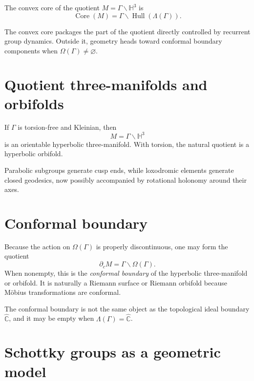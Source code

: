 \begin{definition}\label{def:vii37-convex-core}
The convex core of the quotient \(M=\Gamma\backslash\mathbb H^3\) is
\[
\operatorname{Core}(M)=\Gamma\backslash\operatorname{Hull}(\Lambda(\Gamma)).
\]
\end{definition}

The convex core packages the part of the quotient directly controlled by recurrent group dynamics.  Outside it, geometry heads toward conformal boundary components when \(\Omega(\Gamma)\ne\varnothing\).


\section{Quotient three-manifolds and orbifolds}

\begin{theorem}\label{thm:vii37-quotient}
If \(\Gamma\) is torsion-free and Kleinian, then
\[
M=\Gamma\backslash\mathbb H^3
\]
is an orientable hyperbolic three-manifold.  With torsion, the natural quotient is a hyperbolic orbifold.
\end{theorem}

Parabolic subgroups generate cusp ends, while loxodromic elements generate closed geodesics, now possibly accompanied by rotational holonomy around their axes.


\section{Conformal boundary}

Because the action on \(\Omega(\Gamma)\) is properly discontinuous, one may form the quotient
\[
\partial_c M=\Gamma\backslash\Omega(\Gamma).
\]
When nonempty, this is the \emph{conformal boundary} of the hyperbolic three-manifold or orbifold.  It is naturally a Riemann surface or Riemann orbifold because Möbius transformations are conformal.

\begin{warning}
The conformal boundary is not the same object as the topological ideal boundary \(\widehat{\mathbb C}\), and it may be empty when \(\Lambda(\Gamma)=\widehat{\mathbb C}\).
\end{warning}


\section{Schottky groups as a geometric model}

